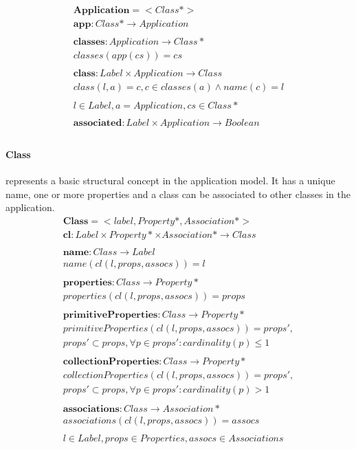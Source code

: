 \documentclass[11pt]{article}
\begin{document}
\begin{align*}
  \mathbf{Application} = < Class* > \\ 
  \mathbf{app} : Class* \rightarrow  Application \\ \\
  \mathbf{classes} : Application \rightarrow Class* \\
  classes(app(cs)) = cs  \\\\
  \mathbf{class} : Label \times Application \rightarrow Class   \\ 
  class(l, a) = c, c \in classes(a) \wedge name(c) = l \\ \\
  l \in Label, a = Application, cs \in Class* 
  \\ \\
  \mathbf{associated} :  Label \times Application \rightarrow Boolean \\
\end{align*}


\paragraph{Class} represents a basic structural concept in the application model. It has a unique name, one or more properties and a class can be associated to other classes in the application. 
\begin{align*}
	\mathbf{Class} = <label, Property*, Association*> \\
	\mathbf{cl} : Label \times Property* \times Association* \rightarrow Class \\\\
	\mathbf{name} : Class \rightarrow Label \\
	name(cl(l, props, assocs)) = l \\ \\
	\mathbf{properties} : Class \rightarrow Property* \\
	properties(cl(l, props, assocs)) = props \\ \\
	\mathbf{primitiveProperties} : Class \rightarrow Property* \\	primitiveProperties(cl(l, props, assocs)) = props', \\ props' \subset props,  \forall p \in props' : cardinality(p) \leq 1 \\ \\
	\mathbf{collectionProperties} : Class \rightarrow Property* \\	collectionProperties(cl(l, props, assocs)) = props', \\ props' \subset props, \forall p \in props' : cardinality(p) > 1 \\ \\
	\mathbf{associations} : Class \rightarrow Association* \\	associations(cl(l, props, assocs)) = assocs \\ \\
l \in Label, props \in Properties, assocs \in Associations
\end{align*}
\end{document}
